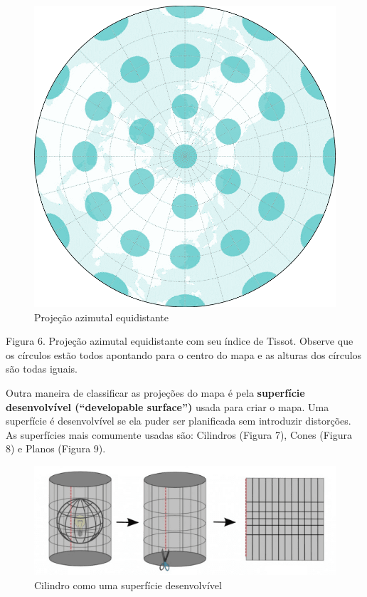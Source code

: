 \documentclass[
]{krantz}
\begin{document}
\begin{figure}
\centering
\includegraphics{media/modulo0/az-equidistant.png}
\caption{Projeção azimutal equidistante}
\end{figure}

Figura 6. Projeção azimutal equidistante com seu índice de Tissot. Observe que os círculos estão todos apontando para o centro do mapa e as alturas dos círculos são todas iguais.

Outra maneira de classificar as projeções do mapa é pela \textbf{superfície desenvolvível (``developable surface'')} usada para criar o mapa. Uma superfície é desenvolvível se ela puder ser planificada sem introduzir distorções. As superfícies mais comumente usadas são: Cilindros (Figura 7), Cones (Figura 8) e Planos (Figura 9).

\begin{figure}
\centering
\includegraphics{media/modulo0/cylinder.png}
\caption{Cilindro como uma superfície desenvolvível}
\end{figure}
\end{document}
